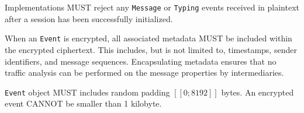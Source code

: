 Implementations MUST reject any \texttt{Message} or \texttt{Typing} events
received in plaintext after a session has been successfully initialized.
\bigskip

When an \texttt{Event} is encrypted, all associated metadata MUST be included
within the encrypted ciphertext. This includes, but is not limited to,
timestamps, sender identifiers, and message sequences. Encapsulating metadata
ensures that no traffic analysis can be performed on the message properties by
intermediaries.
\bigskip

\texttt{Event} object MUST includes random padding \([\![0;8192]\!]\) bytes. An
encrypted event CANNOT be smaller than 1 kilobyte.


